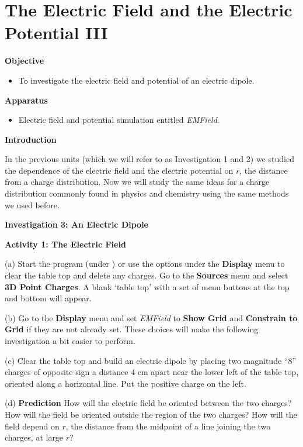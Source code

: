 
\section{The Electric Field and the Electric Potential III}

\makelabheader %

\textbf{Objective}

\begin{itemize}
\item To investigate the electric field and potential of an electric dipole.
\end{itemize}

\textbf{Apparatus}

\begin{itemize}
\item Electric field and potential simulation entitled {\it EMField}.
\end{itemize}

\textbf{Introduction}

In the previous units (which we will refer to as Investigation 1 and 2) we studied the dependence
of the electric field and the electric potential on $r$, the distance from
a charge distribution.
Now we will study the same ideas for a charge distribution commonly found in physics and chemistry
using the same methods we used before.

\textbf{Investigation 3: An Electric Dipole}

\textbf{Activity 1: The Electric Field}

(a) Start the program  (under ) or use the options under the 
\textbf{Display} menu to clear the table top and delete any charges.
Go to the \textbf{Sources} menu and select \textbf{3D Point Charges}.
A blank `table top' with a set of menu 
buttons at the top and bottom will appear.

(b) Go to the {\bf Display} menu and set {\it EMField} to
{\bf Show Grid} and {\bf Constrain to Grid} if they are not already set.
These choices will make the following investigation a bit easier to perform.

(c) Clear the table top and build an electric dipole by placing two magnitude
{}``8'' charges of opposite sign a distance 4 cm apart near the lower left 
of the table top, oriented along a horizontal line. Put the positive charge 
on the left.


(d) {\bf Prediction} How will the electric field be oriented between the two charges? How will the field be oriented outside the region of the two charges?
How will the field depend on $r$, the distance from the midpoint of a line joining the two charges, at large $r$?
\vspace{25mm}

